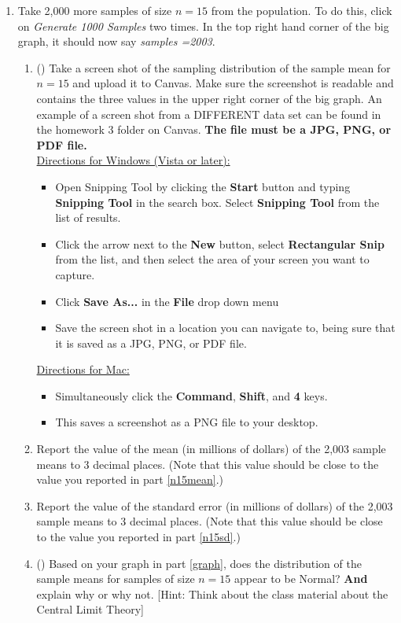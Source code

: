 \begin{enumerate}
\item Take 2,000 more samples of size $n=15$ from the population.  To do this, click on \textit{Generate 1000 Samples} two times.  In the top right hand corner of the big graph, it should now say \textit{samples =2003}.
\begin{enumerate}
\item \label{graph}(\textbf{}) Take a screen shot of the sampling distribution of the sample mean for $n=15$ and upload it to Canvas.  Make sure the screenshot is readable and contains the three values in the upper right corner of the big graph.  An example of a screen shot from a DIFFERENT data set can be found in the homework 3 folder on Canvas.  \textbf{The file must be a JPG, PNG, or PDF file.}\\
\underline{Directions for Windows (Vista or later):}
\begin{itemize}
\item Open Snipping Tool by clicking the \textbf{Start} button and typing \textbf{Snipping Tool} in the search box.  Select \textbf{Snipping Tool} from the list of results.
\item Click the arrow next to the \textbf{New} button, select \textbf{Rectangular Snip} from the list, and then select the area of your screen you want to capture.
\item  Click \textbf{Save As...} in the \textbf{File} drop down menu
\item Save the screen shot in a location you can navigate to, being sure that it is saved as a JPG, PNG, or PDF file.
\end{itemize}
\underline{Directions for Mac:}
\begin{itemize}
\item Simultaneously click the \textbf{Command}, \textbf{Shift}, and \textbf{4} keys.
\item This saves a screenshot as a PNG file to your desktop.
\end{itemize}
\item Report the value of the mean  (in millions of dollars) of the 2,003 sample means to 3 decimal places.  (Note that this value should be close to the value you reported in part \ref{n15mean}.)
\item Report the value of the standard error  (in millions of dollars) of the 2,003 sample means to 3 decimal places.  (Note that this value should be close to the value you reported in part \ref{n15sd}.)
\item (\textbf{})  Based on your graph in part \ref{graph}, does the distribution of the sample means for samples of size $n=15$ appear to be Normal?  \textbf{And} explain why or why not. [Hint: Think about the class material about the Central Limit Theory] \\
\end{enumerate}


\end{enumerate}
